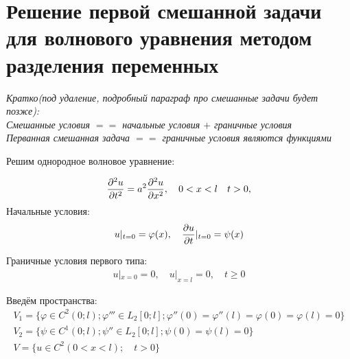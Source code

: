 \documentclass[../main.tex]{subfiles}
\begin{document}
\section{Решение первой смешанной задачи для волнового уравнения
    методом разделения переменных}
    \textit{Кратко(под удаление, подробный параграф про смешанные задачи будет позже):\\
    Смешанные условия $==$ начальные условия $+$ граничные условия\\
    Перванная смешанная задача $==$ граничные условия являются функциями\\}

    Решим однородное волновое уравнение:
    
    \begin{gather}
        \label{eq:2.8.1}
        \frac{\partial^2 u}{\partial t^2} = a^2 \frac{\partial^2 u}{\partial x^2}, \quad 0<x<l \quad t>0,
    \end{gather}
    Начальные условия: 
    \begin{gather}
        \label{eq:2.8.2}
        u|_{t=0}=\varphi(x), \quad \frac{\partial u}{\partial t}|_{t=0}=\psi(x)
    \end{gather}

    Граничные условия первого типа: 
    \begin{gather}
        \label{eq:2.8.3}
        u|_{x=0}=0,\quad u|_{x=l}=0, \quad t\geq 0
    \end{gather}

    Введём пространства:
    \begin{gather*}
        V_1=\{\varphi \in C^2(0;l); \varphi'''\in L_2[0;l];
                \varphi''(0) = \varphi''(l) = \varphi(0) = \varphi(l) = 0\}\\
        V_2=\{\psi \in C^1(0;l); \psi''\in L_2[0;l];
                \psi(0) = \psi(l) = 0\}\\
        V = \{u \in C^2(0<x<l);\quad t>0\}
    \end{gather*}
\end{document}
